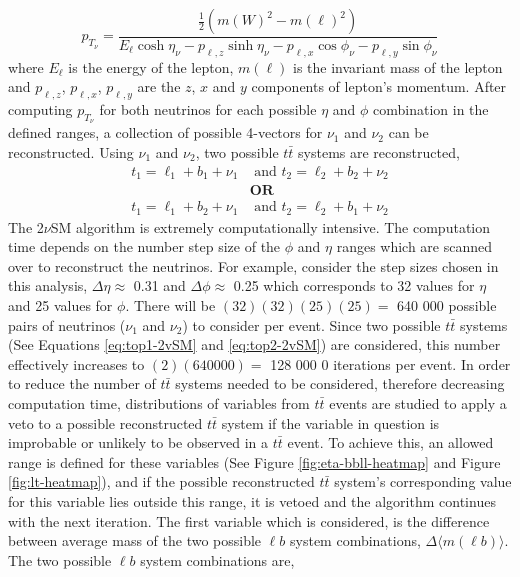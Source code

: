 \begin{equation}
    p_{{T}_{\nu}} = \frac{\frac{1}{2} (m(W)^{2} - m(\ell)^{2})}{E_{\ell}\cosh{\eta_{\nu}} - p_{\ell,z}\sinh{\eta_{\nu}} - p_{\ell,x}\cos{\phi_{\nu}} - p_{\ell,y}\sin{\phi_{\nu}} }
\end{equation}where $E_{\ell}$ is the energy of the lepton, $m(\ell)$ is the invariant mass of the lepton and $p_{\ell, z}$, $p_{\ell, x}$, $p_{\ell, y}$ are the $z$, $x$ and $y$ components of lepton's momentum. After computing $p_{{T}_{\nu}}$ for both neutrinos for each possible $\eta$ and $\phi$ combination in the defined ranges, a collection of possible 4-vectors for $\nu_{1}$ and $\nu_{2}$ can be reconstructed. Using $\nu_{1}$ and $\nu_{2}$, two possible $t\bar{t}$ systems are reconstructed,
\begin{align}
    t_{1} = \ell_{1} + b_{1} + \nu_{1} &\text{ and } t_{2} = \ell_{2} + b_{2} + \nu_{2} \label{eq:top1-2vSM}\\
    &\textbf{OR}\nonumber\\ 
     t_{1} = \ell_{1} + b_{2} + \nu_{1} &\text{ and } t_{2} = \ell_{2} + b_{1} + \nu_{2} \label{eq:top2-2vSM}
\end{align}The 2$\nu$SM algorithm is extremely computationally intensive. The computation time depends on the number step size of the $\phi$ and $\eta$ ranges which are scanned over to reconstruct the neutrinos. For example, consider the step sizes chosen in this analysis, $\Delta \eta \approx$ 0.31 and $\Delta \phi \approx$ 0.25 which corresponds to 32 values for $\eta$ and 25 values for $\phi$. There will be $(32)(32)(25)(25) = $ 640 000 possible pairs of neutrinos ($\nu_{1}$ and $\nu_{2}$) to consider per event. Since two possible $t\bar{t}$ systems (See Equations \ref{eq:top1-2vSM} and \ref{eq:top2-2vSM}) are considered, this number effectively increases to $(2)(640000) = $ 128 000 0 iterations per event. In order to reduce the number of $t\bar{t}$ systems needed to be considered, therefore decreasing computation time, distributions of variables from $t\bar{t}$ events are studied to apply a veto to a possible reconstructed $t\bar{t}$ system if the variable in question is improbable or unlikely to be observed in a $t\bar{t}$ event. To achieve this, an allowed range is defined for these variables (See Figure \ref{fig:eta-bbll-heatmap} and Figure \ref{fig:lt-heatmap}), and if the possible reconstructed $t\bar{t}$ system's corresponding value for this variable lies outside this range, it is vetoed and the algorithm continues with the next iteration. The first variable which is considered, is the difference between average mass of the two possible $\ell b$ system combinations, $\Delta \langle m(\ell b)\rangle$. The two possible $\ell b$ system combinations are,

